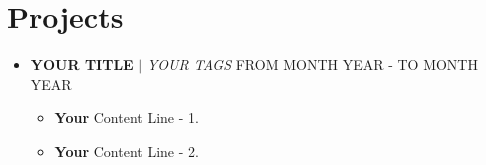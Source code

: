 \documentclass[letterpaper,5pt]{article}
\begin{document}
    
    \section{Projects}
    
        \begin{itemize}[leftmargin=0.15in,label={}]
          \item{
            \textbf{YOUR TITLE} $|$ \emph{YOUR TAGS}
          }
          \hfill FROM MONTH YEAR - TO MONTH YEAR
          \begin{itemize} 
            \item[\textbullet{}]\textbf{Your} Content Line - 1.
            \item[\textbullet{}]\textbf{Your} Content Line - 2.
          \end{itemize}
          \end{itemize}

        


    
      
    
    
    
    
      
\end{document}
